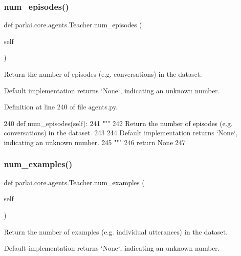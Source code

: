 \subsubsection{\texorpdfstring{num\+\_\+episodes()}{num\_episodes()}}
{\footnotesize\ttfamily def parlai.\+core.\+agents.\+Teacher.\+num\+\_\+episodes (\begin{DoxyParamCaption}\item[{}]{self }\end{DoxyParamCaption})}

\begin{DoxyVerb}Return the number of episodes (e.g. conversations) in the dataset.

Default implementation returns `None`, indicating an unknown number.
\end{DoxyVerb}
 

Definition at line 240 of file agents.\+py.


\begin{DoxyCode}
240     \textcolor{keyword}{def }num\_episodes(self):
241         \textcolor{stringliteral}{"""}
242 \textcolor{stringliteral}{        Return the number of episodes (e.g. conversations) in the dataset.}
243 \textcolor{stringliteral}{}
244 \textcolor{stringliteral}{        Default implementation returns `None`, indicating an unknown number.}
245 \textcolor{stringliteral}{        """}
246         \textcolor{keywordflow}{return} \textcolor{keywordtype}{None}
247 
\end{DoxyCode}
\mbox{\label{classparlai_1_1core_1_1agents_1_1Teacher_a93370e4e99236e8ad267b40cd4437920}} 
\subsubsection{\texorpdfstring{num\+\_\+examples()}{num\_examples()}}
{\footnotesize\ttfamily def parlai.\+core.\+agents.\+Teacher.\+num\+\_\+examples (\begin{DoxyParamCaption}\item[{}]{self }\end{DoxyParamCaption})}

\begin{DoxyVerb}Return the number of examples (e.g. individual utterances) in the dataset.

Default implementation returns `None`, indicating an unknown number.
\end{DoxyVerb}
 

